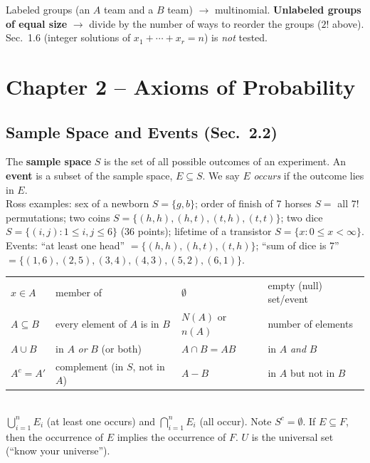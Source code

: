 \documentclass[11pt]{article}
\let\oldsubsection\subsection
\renewcommand{\subsection}{\Needspace{14\baselineskip}\oldsubsection}
\begin{document}
\begin{warnbox}
Labeled groups (an $A$ team and a $B$ team) $\to$ multinomial. \textbf{Unlabeled groups of equal size} $\to$ divide by the number of ways to reorder the groups ($2!$ above). Sec.\ 1.6 (integer solutions of $x_1+\cdots+x_r=n$) is \emph{not} tested.
\end{warnbox}

\section{Chapter 2 -- Axioms of Probability}

\subsection{Sample Space and Events (Sec.\ 2.2)}

\begin{defbox}
The \textbf{sample space} $S$ is the set of all possible outcomes of an experiment. An \textbf{event} is a subset of the sample space, $E\subseteq S$. We say $E$ \emph{occurs} if the outcome lies in $E$.\\
Ross examples: sex of a newborn $S=\{g,b\}$; order of finish of 7 horses $S=$ all $7!$ permutations; two coins $S=\{(h,h),(h,t),(t,h),(t,t)\}$; two dice $S=\{(i,j):1\le i,j\le6\}$ (36 points); lifetime of a transistor $S=\{x:0\le x<\infty\}$.\\
Events: ``at least one head'' $=\{(h,h),(h,t),(t,h)\}$; ``sum of dice is 7'' $=\{(1,6),(2,5),(3,4),(4,3),(5,2),(6,1)\}$.
\end{defbox}

\begin{defbox}
\begin{tabular}{@{}ll@{\qquad}ll@{}}
$x\in A$ & member of & $\emptyset$ & empty (null) set/event\\
$A\subseteq B$ & every element of $A$ is in $B$ & $N(A)$ or $n(A)$ & number of elements\\
$A\cup B$ & in $A$ \emph{or} $B$ (or both) & $A\cap B=AB$ & in $A$ \emph{and} $B$\\
$A^c=A'$ & complement (in $S$, not in $A$) & $A-B$ & in $A$ but not in $B$\\
\end{tabular}\\[3pt]
$\bigcup_{i=1}^nE_i$ (at least one occurs) and $\bigcap_{i=1}^nE_i$ (all occur). Note $S^c=\emptyset$. If $E\subseteq F$, then the occurrence of $E$ implies the occurrence of $F$. $U$ is the universal set (``know your universe'').
\end{defbox}
\end{document}
